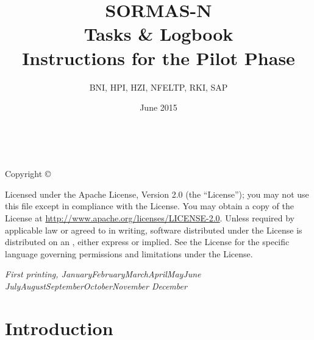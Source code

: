 \documentclass[a4paper, titlepage]{tufte-handout}
\author{BNI, HPI, HZI, NFELTP, RKI, SAP}
\date{June 2015}
\title{SORMAS-N \protect\\ Tasks \& Logbook \protect\\ \LARGE Instructions for the Pilot Phase}
\begin{document}
\maketitle
\renewcommand\plaintitle{SORMAS-N -- Tasks \& Logbook}

\newcommand{\monthyear}{%
  \ifcase\month\or January\or February\or March\or April\or May\or June\or
  July\or August\or September\or October\or November\or
  December\fi\space\number\year
}


\newpage
~\vfill
\thispagestyle{empty}

Copyright \copyright\ \the\year\ \thanklessauthor


\par 
Licensed under the Apache License, Version 2.0 (the ``License''); you may not
use this file except in compliance with the License. You may obtain a copy
of the License at \url{http://www.apache.org/licenses/LICENSE-2.0}. Unless
required by applicable law or agreed to in writing, software distributed
under the License is distributed on an , either express or implied. See the
License for the specific language governing permissions and limitations
under the License.

\par
\textit{First printing, \monthyear}

\newpage

\setcounter{tocdepth}{1}
\tableofcontents
\section{Introduction}
\label{sec-1}
\end{document}
